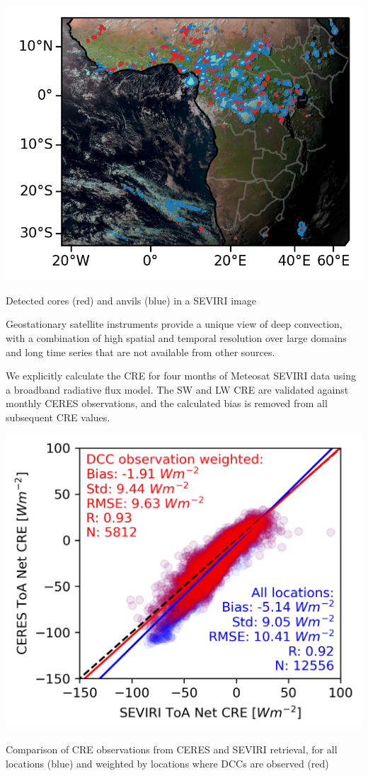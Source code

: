 \documentclass{tufte-handout}
\begin{document}
\begin{marginfigure}%
  \includegraphics[width=\linewidth]{figures/handout_fig1.png}
  \caption{Detected cores (red) and anvils (blue) in a SEVIRI image}
  \label{fig:marginfig}
\end{marginfigure}

Geostationary satellite instruments provide a unique view of deep convection, with a combination of high spatial and temporal resolution over large domains and long time series that are not available from other sources.

We explicitly calculate the CRE for four months of Meteosat SEVIRI\cite[0.5\baselineskip]{aminou_characteristics_1997} data using a broadband radiative flux model.
The SW and LW CRE are validated against monthly CERES observations, and the calculated bias is removed from all subsequent CRE values.

\begin{marginfigure}%
  \includegraphics[width=\linewidth]{figures/handout_fig2.png}
  \caption{Comparison of CRE observations from CERES and SEVIRI retrieval, for all locations (blue) and weighted by locations where DCCs are observed (red)}
  \label{fig:marginfig}
\end{marginfigure}
\end{document}
